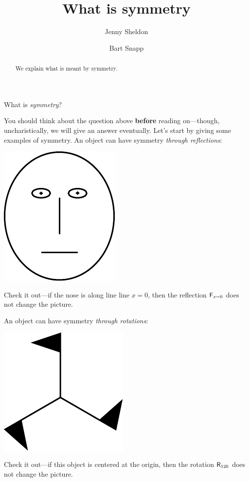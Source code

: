 \documentclass{ximera}
\author{Jenny Sheldon \and Bart Snapp}
\title{What is symmetry}
\begin{document}
\begin{abstract}
  We explain what is meant by symmetry.
\end{abstract}
\maketitle

\begin{question}
What is \textit{symmetry}?
\end{question}

You should think about the question above \textbf{before} reading
on---though, uncharistically, we will give an answer eventually.
Let's start by giving some examples of symmetry. An object can have
symmetry \textit{through reflections}:
\begin{image}
\includegraphics{creepFace.pdf}
\end{image}
Check it out---if the nose is along line line $x=0$, then the
reflection $\mathsf{F}_{x=0}$ does not change the picture.

An object can have symmetry \textit{through rotations}:
\begin{image}
\includegraphics{rotFlags.pdf}
\end{image}
Check it out---if this object is centered at the origin, then the
rotation $\mathsf{R}_{120}$ does not change the picture.
\end{document}
